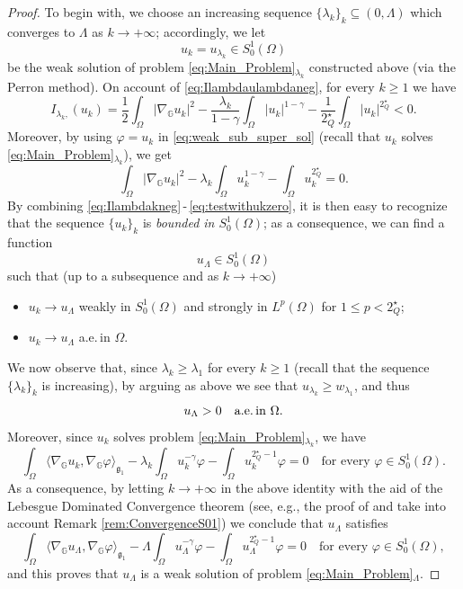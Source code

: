 \documentclass[11pt]{amsart}
\numberwithin{equation}{section} %
\theoremstyle{definition}
\begin{document}
\begin{proof}
	To begin with, we choose an increasing sequence $\{\lambda_k\}_k\subseteq(0,\Lambda)$ 
	which converges to $\Lambda$ as $k\to+\infty$; accordingly, we let
	$$u_k = u_{\lambda_k}\in S^{1}_{0}(\Omega)$$
	be the weak solution of problem \eqref{eq:Main_Problem}$_{\lambda_k}$ constructed
	above (via the Perron method). On account of 
	\eqref{eq:Ilambdaulambdaneg}, for every $k\geq 1$ we have
	\begin{equation} \label{eq:Ilambdakneg}
		I_{\lambda_k,}(u_{k}) 
		= \dfrac{1}{2} \int_{\Omega}|\nabla_{\mathbb{G}}u_k|^2 - \dfrac{\lambda_k}{1-\gamma}\int_{\Omega}|u_k|^{1-\gamma} - \dfrac{1}{2^{\star}_{Q}}\int_{\Omega}|u_k|^{2^{\star}_{Q}} <0.
	\end{equation}
	Moreover, by using $\varphi = u_k$ in \eqref{eq:weak_sub_super_sol} (recall that $u_k$
	solves \eqref{eq:Main_Problem}$_{\lambda_k}$), we get
	\begin{equation} \label{eq:testwithukzero}
		\int_{\Omega}|\nabla_{\mathbb{G}}u_k|^2 -\lambda_k\int_\Omega u_k^{1-\gamma}
		-\int_\Omega u_k^{2^{\star}_{Q}} = 0.
	\end{equation}
	By combining \eqref{eq:Ilambdakneg}\,-\,\eqref{eq:testwithukzero},
	it is then easy to recognize that the sequence $\{u_k\}_k$ is \emph{bounded in $S^{1}_{0}(\Omega)$};
	as a consequence, we can find a function
	$$u_{\Lambda}\in S^{1}_{0}(\Omega)$$ 
	such that
	(up to a subsequence and as $k\to+\infty$)
	\begin{itemize}
		\item[a)] $u_k\to u_{\Lambda}$ weakly in $S^{1}_{0}(\Omega)$ and strongly
		in $L^p(\Omega)$ for $1\leq p <2^{\star}_{Q}$;
		\item[b)] $u_k\to u_{\Lambda}$ a.e.\,in $\Omega$.
	\end{itemize}
	We now observe that, since $\lambda_k\geq \lambda_1$ for every $k\geq 1$
	(recall that the sequence $\{\lambda_k\}_k$ is increasing),
	by arguing as above we see that
	$u_{\lambda_k}\geq w_{\lambda_1}$, and thus
	$$u_{\Lambda} > 0\quad\text{a.e.\,in $\Omega$}.$$
	Moreover, since $u_k$ solves problem \eqref{eq:Main_Problem}$_{\lambda_k}$,
	we have
	$$\int_{\Omega}\langle \nabla_{\mathbb{G}}u_k,\nabla_{\mathbb{G}}\varphi\rangle_{\mathfrak{g}_{1}} -\lambda_k\int_\Omega u_k^{-\gamma}\varphi 
	-\int_\Omega u_k^{2^{\star}_{Q}-1}\varphi = 0\quad\text{for every $\varphi\in S^{1}_{0}(\Omega)$}.$$
	As a consequence, by letting $k\to+\infty$ in the above identity with the aid
	of the Lebesgue Dominated Convergence theorem
	(see, e.g., the proof of \cite[Lemma 2.2]{Haitao}
	and take into account Remark \ref{rem:ConvergenceS01}) we
	conclude that $u_{\Lambda}$ satisfies
	$$\int_{\Omega}\langle \nabla_{\mathbb{G}}u_{\Lambda},\nabla_{\mathbb{G}}\varphi\rangle_{\mathfrak{g}_{1}} -\Lambda\int_\Omega u_{\Lambda}^{-\gamma}\varphi
	-\int_\Omega u_{\Lambda}^{2^{\star}_{Q}-1}\varphi = 0\quad\text{for every $\varphi\in S^{1}_{0}(\Omega)$},$$
	and this proves that $u_{\Lambda}$ is a weak solution of
	problem \eqref{eq:Main_Problem}$_{\Lambda}$. 
	

\end{proof}
\end{document}
